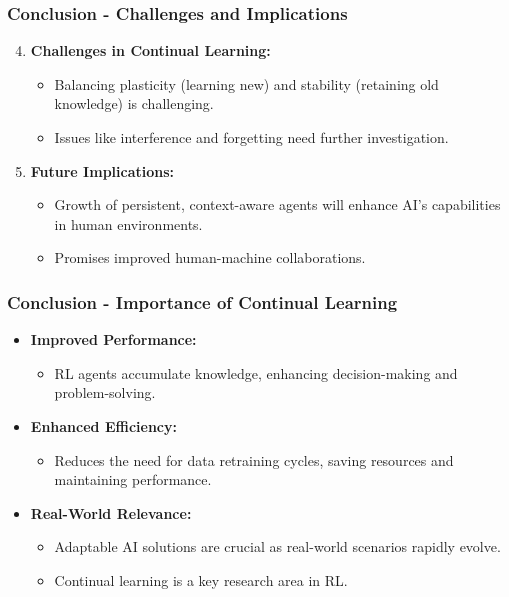 \documentclass[aspectratio=169]{beamer}
\begin{document}
\begin{frame}[fragile]
    \frametitle{Conclusion - Challenges and Implications}
    
    \begin{enumerate}
        \setcounter{enumi}{3}
        \item \textbf{Challenges in Continual Learning:}
        \begin{itemize}
            \item Balancing plasticity (learning new) and stability (retaining old knowledge) is challenging.
            \item Issues like interference and forgetting need further investigation.
        \end{itemize}

        \item \textbf{Future Implications:}
        \begin{itemize}
            \item Growth of persistent, context-aware agents will enhance AI's capabilities in human environments.
            \item Promises improved human-machine collaborations.
        \end{itemize}
    \end{enumerate}
\end{frame}

\begin{frame}[fragile]
    \frametitle{Conclusion - Importance of Continual Learning}
    
    \begin{itemize}
        \item \textbf{Improved Performance:} 
        \begin{itemize}
            \item RL agents accumulate knowledge, enhancing decision-making and problem-solving.
        \end{itemize}
        
        \item \textbf{Enhanced Efficiency:} 
        \begin{itemize}
            \item Reduces the need for data retraining cycles, saving resources and maintaining performance.
        \end{itemize}
        
        \item \textbf{Real-World Relevance:} 
        \begin{itemize}
            \item Adaptable AI solutions are crucial as real-world scenarios rapidly evolve.
            \item Continual learning is a key research area in RL.
        \end{itemize}
    \end{itemize}
\end{frame}
\end{document}

